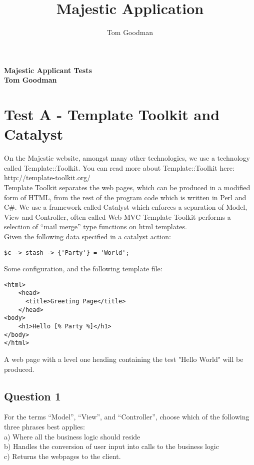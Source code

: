 \documentclass{article}
\title{Majestic Application}
\author{Tom Goodman}
\date{}
\begin{document}
\begin{titlepage}
	\begin{flushleft}
		\vspace*{1cm}
		\Huge
		\textbf{Majestic Applicant Tests} \\
		\vspace*{1cm}
		\Large
		\textbf{Tom Goodman} \\
	\end{flushleft}
\end{titlepage}
\newpage

\section{Test A - Template Toolkit and Catalyst}
On the Majestic website, amongst many other technologies, we use a technology called Template::Toolkit. You can read more about Template::Toolkit here:
http://template-toolkit.org/ 
\\
\newline
Template Toolkit separates the web pages, which can be produced in a modified form of HTML, from the rest of the program code which is written in Perl and C\#. We use a framework called Catalyst which enforces a separation of Model, View and Controller, often called Web MVC
Template Toolkit performs a selection of “mail merge” type functions on html templates. \\
\newline
Given the following data specified in a catalyst action:\\
\newline
\begin{lstlisting}
$c -> stash -> {'Party'} = 'World'; 
\end{lstlisting}
Some configuration, and the following template file: \\
\begin{lstlisting}
<html>
    <head>
      <title>Greeting Page</title>
    </head>
<body>
    <h1>Hello [% Party %]</h1>
</body>
</html>
\end{lstlisting}
A web page with a level one heading containing the test "Hello World" will be produced.

\subsection{Question 1}
For the terms “Model”, “View”, and “Controller”, choose which of the following three phrases best applies:\\
\newline
a) Where all the business logic should reside\\
b) Handles the conversion of user input into calls to the business logic\\
c) Returns the webpages to the client.\\
\end{document}
